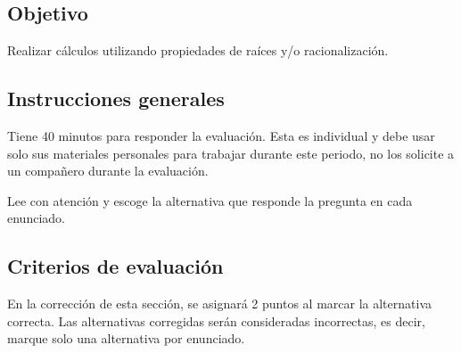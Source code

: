 \documentclass[]{srs}
\begin{document}
\subsection*{Objetivo}
  Realizar cálculos utilizando propiedades de raíces y/o racionalización.

\subsection*{Instrucciones generales}
  Tiene 40 minutos para responder la evaluación. Esta es individual y debe
  usar solo sus materiales personales para trabajar durante este periodo, no los solicite
  a un compañero durante la evaluación.

  Lee con atención y escoge la alternativa que responde la pregunta en cada enunciado.

\subsection*{Criterios de evaluación}
En la corrección de esta sección, se asignará 2 puntos al marcar la alternativa correcta.
Las alternativas corregidas serán consideradas incorrectas, es decir, marque solo una
alternativa por enunciado.

\separador[2mm]
\end{document}
